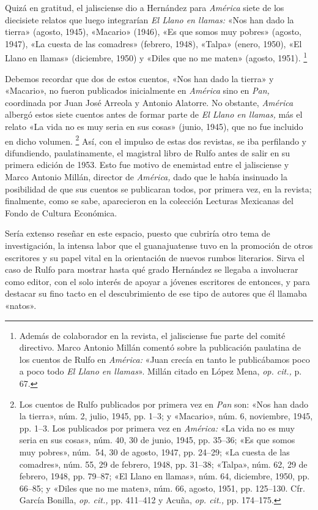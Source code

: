 \documentclass[14pt,twoside,final]{extbook} %
\let\oldfootnote\footnote
\renewcommand\footnote[1]{%
\oldfootnote{\hspace{1mm}#1}}
\begin{document}
Quizá en gratitud, el jalisciense dio a Hernández para \emph{América} siete de los diecisiete relatos que luego integrarían \emph{El Llano en llamas:} «Nos han dado la tierra» (agosto, 1945), «Macario» (1946), «Es que somos muy pobres» (agosto, 1947), «La cuesta de las comadres» (febrero, 1948), «Talpa» (enero, 1950), «El Llano en llamas» (diciembre, 1950) y «Diles que no me maten» (agosto, 1951).\footnote{Además de colaborador en la revista, el jalisciense fue parte del comité directivo. Marco Antonio Millán comentó sobre la publicación paulatina de los cuentos de Rulfo en \emph{América:} «Juan crecía en tanto le publicábamos poco a poco todo \emph{El Llano en llamas}». Millán citado en López Mena, \emph{op. cit.,} p. 67.}

Debemos recordar que dos de estos cuentos, «Nos han dado la tierra» y «Macario», no fueron publicados inicialmente en \emph{América} sino en \emph{Pan,} coordinada por Juan José Arreola y Antonio Alatorre. No obstante, \emph{América} albergó estos siete cuentos antes de formar parte de \emph{El Llano en llamas,} más el relato «La vida no es muy seria en sus cosas» (junio, 1945), que no fue incluido en dicho volumen.\footnote{Los cuentos de Rulfo publicados por primera vez en \emph{Pan} son: «Nos han dado la tierra», núm. 2, julio, 1945, pp. 1--3; y «Macario», núm. 6, noviembre, 1945, pp. 1--3. Los publicados por primera vez en \emph{América:} «La vida no es muy seria en sus cosas», núm. 40, 30 de junio, 1945, pp. 35--36; «Es que somos muy pobres», núm.~54, 30 de agosto, 1947, pp. 24--29; «La cuesta de las comadres», núm. 55, 29 de febrero, 1948, pp. 31--38; «Talpa», núm. 62, 29 de febrero, 1948, pp. 79--87; «El Llano en llamas», núm. 64, diciembre, 1950, pp. 66--85; y «Diles que no me maten», núm. 66, agosto, 1951, pp. 125--130. Cfr. García Bonilla, \emph{op. cit.,} pp. 411--412 y Acuña, \emph{op. cit.,} pp. 174--175.} Así, con el impulso de estas dos revistas, se iba perfilando y difundiendo, paulatinamente, el magistral libro de Rulfo antes de salir en su primera edición de 1953. Esto fue motivo de enemistad entre el jalisciense y Marco Antonio Millán, director de \emph{América,} dado que le había insinuado la posibilidad de que sus cuentos se publicaran todos, por primera vez, en la revista; finalmente, como se sabe, aparecieron en la colección Lecturas Mexicanas del Fondo de Cultura Económica.

Sería extenso reseñar en este espacio, puesto que cubriría otro tema de investigación, la intensa labor que el guanajuatense tuvo en la promoción de otros escritores y su papel vital en la orientación de nuevos rumbos literarios. Sirva el caso de Rulfo para mostrar hasta qué grado Hernández se llegaba a involucrar como editor, con el solo interés de apoyar a jóvenes escritores de entonces, y para destacar su fino tacto en el descubrimiento de ese tipo de autores que él llamaba «natos».\protect\enlargethispage*{\baselineskip}
\end{document}
